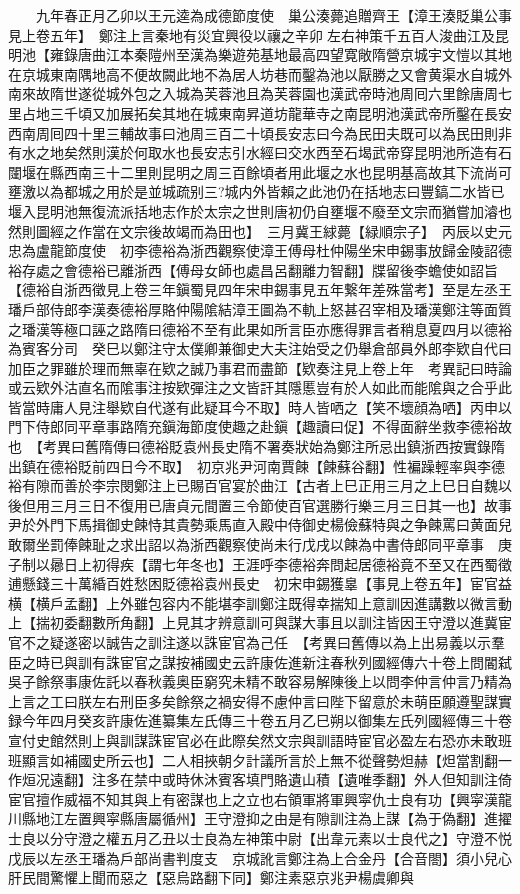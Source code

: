 　　九年春正月乙卯以王元逵為成德節度使　巢公湊薨追贈齊王【漳王湊貶巢公事見上卷五年】　鄭注上言秦地有災宜興役以禳之辛卯左右神策千五百人浚曲江及昆明池【雍錄唐曲江本秦隑州至漢為樂遊苑基地最高四望寛敞隋營京城宇文愷以其地在京城東南隅地高不便故闕此地不為居人坊巷而鑿為池以厭勝之又會黄渠水自城外南來故隋世遂從城外包之入城為芙蓉池且為芙蓉園也漢武帝時池周囘六里餘唐周七里占地三千頃又加展拓矣其地在城東南昇道坊龍華寺之南昆明池漢武帝所鑿在長安西南周囘四十里三輔故事曰池周三百二十頃長安志曰今為民田夫既可以為民田則非有水之地矣然則漢於何取水也長安志引水經曰交水西至石堨武帝穿昆明池所造有石闥堰在縣西南三十二里則昆明之周三百餘頃者用此堰之水也昆明基高故其下流尚可壅激以為都城之用於是並城疏别三?城内外皆賴之此池仍在括地志曰豐鎬二水皆已堰入昆明池無復流派括地志作於太宗之世則唐初仍自壅堰不廢至文宗而猶嘗加濬也然則圖經之作當在文宗後故竭而為田也】　三月冀王絿薨【緑順宗子】　丙辰以史元忠為盧龍節度使　初李德裕為浙西觀察使漳王傅母杜仲陽坐宋申錫事放歸金陵詔德裕存處之會德裕已離浙西【傅母女師也處昌呂翻離力智翻】牒留後李蟾使如詔旨【德裕自浙西徵見上卷三年鎭蜀見四年宋申錫事見五年繋年差殊當考】至是左丞王璠戶部侍郎李漢奏德裕厚賂仲陽隂結漳王圖為不軌上怒甚召宰相及璠漢鄭注等面質之璠漢等極口誣之路隋曰德裕不至有此果如所言臣亦應得罪言者稍息夏四月以德裕為賓客分司　癸巳以鄭注守太僕卿兼御史大夫注始受之仍舉倉部員外郎李欵自代曰加臣之罪雖於理而無辜在欵之誠乃事君而盡節【欵奏注見上卷上年　考異記曰時論或云欵外沽直名而隂事注按欵彈注之文皆訐其隱慝豈有於人如此而能隂與之合乎此皆當時庸人見注舉欵自代遂有此疑耳今不取】時人皆哂之【笑不壞顔為哂】丙申以門下侍郎同平章事路隋充鎭海節度使趣之赴鎭【趣讀曰促】不得面辭坐救李德裕故也　【考異曰舊隋傳曰德裕貶袁州長史隋不署奏狀始為鄭注所忌出鎮浙西按實錄隋出鎮在德裕貶前四日今不取】　初京兆尹河南賈餗【餗蘇谷翻】性褊躁輕率與李德裕有隙而善於李宗閔鄭注上已賜百官宴於曲江【古者上巳正用三月之上巳日自魏以後但用三月三日不復用已唐貞元間置三令節使百官選勝行樂三月三日其一也】故事尹於外門下馬揖御史餗恃其貴勢乘馬直入殿中侍御史楊儉蘇特與之争餗罵曰黄面兒敢爾坐罰俸餗耻之求出詔以為浙西觀察使尚未行戊戌以餗為中書侍郎同平章事　庚子制以曏日上初得疾【謂七年冬也】王涯呼李德裕奔問起居德裕竟不至又在西蜀徵逋懸錢三十萬緍百姓愁困貶德裕袁州長史　初宋申錫獲辠【事見上卷五年】宦官益横【横戶孟翻】上外雖包容内不能堪李訓鄭注既得幸揣知上意訓因進講數以微言動上【揣初委翻數所角翻】上見其才辨意訓可與謀大事且以訓注皆因王守澄以進冀宦官不之疑遂密以誠告之訓注遂以誅宦官為己任　【考異曰舊傳以為上出易義以示羣臣之時已與訓有誅宦官之謀按補國史云許康佐進新注春秋列國經傳六十卷上問閽弑吳子餘祭事康佐託以春秋義奥臣窮究未精不敢容易解陳後上以問李仲言仲言乃精為上言之工曰朕左右刑臣多矣餘祭之禍安得不慮仲言曰陛下留意於未萌臣願遵聖謀實録今年四月癸亥許康佐進纂集左氏傳三十卷五月乙巳朔以御集左氏列國經傳三十卷宣付史館然則上與訓謀誅宦官必在此際矣然文宗與訓語時宦官必盈左右恐亦未敢班班顯言如補國史所云也】二人相挾朝夕計議所言於上無不從聲勢炟赫【炟當割翻一作烜况遠翻】注多在禁中或時休沐賓客填門賂遺山積【遺唯季翻】外人但知訓注倚宦官擅作威福不知其與上有密謀也上之立也右領軍將軍興寜仇士良有功【興寜漢龍川縣地江左置興寜縣唐屬循州】王守澄抑之由是有隙訓注為上謀【為于偽翻】進擢士良以分守澄之權五月乙丑以士良為左神策中尉【出韋元素以士良代之】守澄不悦　戊辰以左丞王璠為戶部尚書判度支　京城訛言鄭注為上合金丹【合音閤】須小兒心肝民間驚懼上聞而惡之【惡烏路翻下同】鄭注素惡京兆尹楊虞卿與
